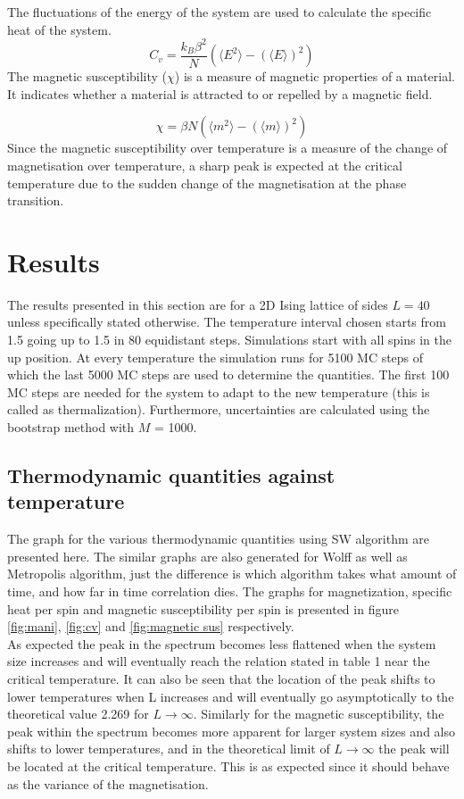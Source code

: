 \documentclass[a4paper,8pt]{article}
\begin{document}
\noindent The fluctuations of the energy of the system are used to calculate the specific heat of the system.
\begin{equation}
    C_v = \frac{k_{B} \beta^2}{N} (\langle  E^2 \rangle - (\langle E \rangle)^2 )
\end{equation}
The magnetic susceptibility ($\chi$) is a measure of magnetic properties of a material. It indicates whether a material is attracted to or repelled by a magnetic field.

\begin{equation}
    \chi = \beta N (\langle  m^2 \rangle - (\langle m \rangle)^2 )
\end{equation}
Since the magnetic susceptibility over temperature is a measure of the change of magnetisation over temperature, a sharp peak is expected at the critical temperature due to the sudden change of the magnetisation at the phase transition.

\section{Results}
The results presented in this section are for a 2D Ising lattice of sides $L = 40$ unless specifically stated otherwise. The temperature interval chosen starts from 1.5 going up to 1.5 in 80 equidistant steps. Simulations start with all spins in the up position. At every temperature the simulation runs for 5100 MC steps of which the last 5000 MC steps are used to determine the quantities. The first 100 MC steps are needed for the system to adapt to the new temperature (this is called as thermalization). Furthermore, uncertainties are calculated using the bootstrap method with $M$ = 1000.

\subsection{Thermodynamic quantities against temperature}

The graph for the various thermodynamic quantities using SW algorithm are presented here. The similar graphs are also generated for Wolff as well as Metropolis algorithm, just the difference is which algorithm takes what amount of time, and how far in time correlation dies.  The graphs for magnetization, specific heat per spin and magnetic susceptibility per spin is presented in figure \ref{fig:mani}, \ref{fig:cv} and \ref{fig:magnetic sus} respectively. \\

As expected the peak in the spectrum becomes less flattened when the system size increases and will eventually reach the relation stated in table 1 near the critical temperature. It can also be seen that the location of the peak shifts to lower temperatures when L increases and will eventually go asymptotically to the theoretical value 2.269 for $L \rightarrow \infty$. Similarly for the magnetic susceptibility, the peak within the spectrum becomes more
apparent for larger system sizes and also shifts to lower temperatures, and in the theoretical limit of $L \rightarrow \infty$ the peak will be located at the critical temperature. This is as expected since it should behave as the variance of the magnetisation. \\
\end{document}
